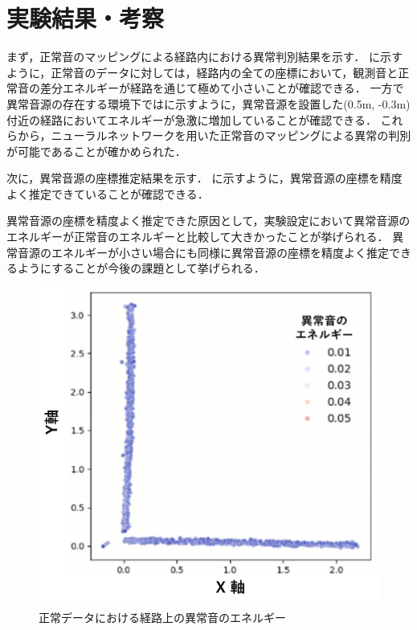 \documentclass[../main]{subfiles}
\begin{document}
\graphicspath{{../figures}}

\section{実験結果・考察}
まず，正常音のマッピングによる経路内における異常判別結果を示す．
に示すように，正常音のデータに対しては，経路内の全ての座標において，観測音と正常音の差分エネルギーが経路を通じて極めて小さいことが確認できる．
一方で異常音源の存在する環境下ではに示すように，異常音源を設置した(0.5m, -0.3m)付近の経路においてエネルギーが急激に増加していることが確認できる．
これらから，ニューラルネットワークを用いた正常音のマッピングによる異常の判別が可能であることが確かめられた．

次に，異常音源の座標推定結果を示す．
に示すように，異常音源の座標を精度よく推定できていることが確認できる．

異常音源の座標を精度よく推定できた原因として，実験設定において異常音源のエネルギーが正常音のエネルギーと比較して大きかったことが挙げられる．
異常音源のエネルギーが小さい場合にも同様に異常音源の座標を精度よく推定できるようにすることが今後の課題として挙げられる．

\begin{figure}[tb]
  \centering
  \includegraphics[keepaspectratio, width=0.8\linewidth]{energy_normal.pdf}
  \caption{正常データにおける経路上の異常音のエネルギー}
\end{figure}
\end{document}
